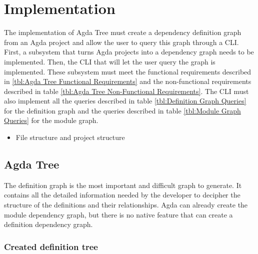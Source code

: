 
\chapter{Implementation} \label{ch:implementation}

The implementation of Agda Tree must create a dependency definition graph from
an Agda project and allow the user to query this graph through a CLI. First, a
subsystem that turns Agda projects into a dependency graph needs to be
implemented. Then, the CLI that will let the user query the graph is
implemented. These subsystem must meet the functional requirements described in
\ref{tbl:Agda Tree Functional Requirements} and the non-functional requirements
described in table \ref{tbl:Agda Tree Non-Functional Requirements}. The CLI
must also implement all the queries described in table \ref{tbl:Definition Graph Queries} 
for the definition graph and the queries described in table
\ref{tbl:Module Graph Queries} for the module graph.


\begin{itemize}
\item File structure and project structure
\end{itemize}

\section{Agda Tree}

The definition graph is the most important and difficult graph to generate. It
contains all the detailed information needed by the developer to decipher the
structure of the definitions and their relationships. Agda can already create
the module dependency graph, but there is no native feature that can create a
definition dependency graph. 

\subsection{Created definition tree}


